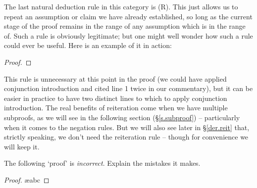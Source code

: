 The last natural deduction rule in this category is  (R). This just allows us to repeat an assumption or claim  we have already established, so long as the current stage of the proof remains in the range of any assumption which  is in the range of.
Such a rule is obviously legitimate; but one might well wonder how such a rule could ever be useful. Here is an example of it in action: \begin{proof}
\end{proof}
This rule is unnecessary at this point in the proof (we could have applied conjunction introduction and cited line 1 twice in our commentary), but it can be easier in practice to have two distinct lines to which to apply conjunction introduction. The real benefits of reiteration come when we have multiple subproofs, as we will see in the following section (§\ref{s.subproof}) – particularly when it comes to the negation rules. But we will also see later in §\ref{der.reit} that, strictly speaking, we don't need the reiteration rule – though for convenience we will keep it.


\practiceproblems
\problempart
The following `proof' is \emph{incorrect}. Explain the mistakes it makes.

\begin{proof}
\ae{abc}
\end{proof}

